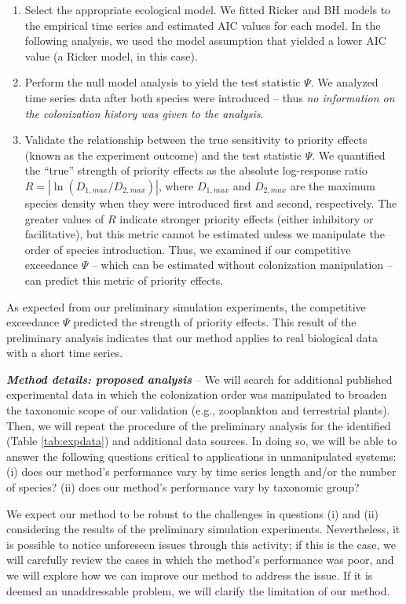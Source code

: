 \documentclass[12pt, class=article, crop=false]{standalone}
\begin{document}
\begin{enumerate}
    \item Select the appropriate ecological model.
    We fitted Ricker and BH models to the empirical time series and estimated AIC values for each model.
    In the following analysis, we used the model assumption that yielded a lower AIC value (a Ricker model, in this case).
    \item Perform the null model analysis to yield the test statistic $\Psi$.
    We analyzed time series data after both species were introduced -- thus \textit{no information on the colonization history was given to the analysis}.
    \item Validate the relationship between the true sensitivity to priority effects (known as the experiment outcome) and the test statistic $\Psi$.
    We quantified the ``true'' strength of priority effects as the absolute log-response ratio $R = |\ln (D_{1, max} / D_{2, max})|$, where $D_{1, max}$ and $D_{2, max}$ are the maximum species density when they were introduced first and second, respectively.
    The greater values of $R$ indicate stronger priority effects (either inhibitory or facilitative), but this metric cannot be estimated unless we manipulate the order of species introduction.
    Thus, we examined if our competitive exceedance $\Psi$ -- which can be estimated without colonization manipulation -- can predict this metric of priority effects.
\end{enumerate}

As expected from our preliminary simulation experiments, the competitive exceedance $\Psi$ predicted the strength of priority effects.
This result of the preliminary analysis indicates that our method applies to real biological data with a short time series.


\textit{\textbf{Method details: proposed analysis}} --
We will search for additional published experimental data in which the colonization order was manipulated to broaden the taxonomic scope of our validation (e.g., zooplankton and terrestrial plants).
Then, we will repeat the procedure of the preliminary analysis for the identified (Table \ref{tab:expdata}) and additional data sources. 
In doing so, we will be able to answer the following questions critical to applications in unmanipulated systems: (i) does our method's performance vary by time series length and/or the number of species? (ii) does our method's performance vary by taxonomic group?

We expect our method to be robust to the challenges in questions (i) and (ii) considering the results of the preliminary simulation experiments.
Nevertheless, it is possible to notice unforeseen issues through this activity; if this is the case, we will carefully review the cases in which the method's performance was poor, and we will explore how we can improve our method to address the issue.
If it is deemed an unaddressable problem, we will clarify the limitation of our method.
\end{document}
